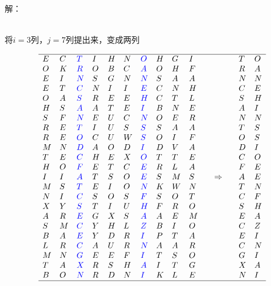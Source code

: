 \documentclass{article}
\begin{document}
解：

~\\

将$i=3$列，$j=7$列提出来，变成两列

$$
\begin{array}{lllllllllllllll}
\hline
E& C& \color{blue}{T}& I& H& N& \color{blue}{O}& H& G& I& &&& T& O\\
O& K& \color{blue}{R}& O& B& C& \color{blue}{A}& O& H& F& &&& R& A\\
E& I& \color{blue}{N}& S& G& N& \color{blue}{N}& S& A& A& &&& N& N\\
E& T& \color{blue}{C}& N& I& I& \color{blue}{E}& C& N& H& &&& C& E\\
O& A& \color{blue}{S}& R& E& E& \color{blue}{H}& C& T& L& &&& S& H\\
H& S& \color{blue}{A}& A& T& E& \color{blue}{I}& B& N& E& &&& A& I\\
S& F& \color{blue}{N}& E& U& C& \color{blue}{N}& O& E& R& &&& N& N\\
R& E& \color{blue}{T}& I& U& S& \color{blue}{S}& S& A& A& &&& T& S\\
R& E& \color{blue}{O}& C& U& W& \color{blue}{S}& O& I& F& &&& O& S\\
M& N& \color{blue}{D}& A& O& D& \color{blue}{I}& D& V& A& &&& D& I\\
T& E& \color{blue}{C}& H& E& X& \color{blue}{O}& T& T& E& &&& C& O\\
H& O& \color{blue}{F}& E& T& C& \color{blue}{E}& R& L& A& &&& F& E\\
I& I& \color{blue}{A}& T& S& O& \color{blue}{E}& S& M& S& &\Rightarrow	&& A& E\\
M& S& \color{blue}{T}& E& I& O& \color{blue}{N}& K& W& N& &&& T& N\\
N& I& \color{blue}{C}& S& O& S& \color{blue}{F}& S& O& T& &&& C& F\\
X& Y& \color{blue}{S}& T& I& U& \color{blue}{H}& F& R& O& &&& S& H\\
A& R& \color{blue}{E}& G& X& S& \color{blue}{A}& A& E& M& &&& E& A\\
S& M& \color{blue}{C}& Y& H& L& \color{blue}{Z}& B& I& O& &&& C& Z\\
B& A& \color{blue}{E}& Y& D& R& \color{blue}{I}& P& T& A& &&& E& I\\
L& R& \color{blue}{C}& A& U& R& \color{blue}{N}& A& A& R& &&& C& N\\
M& N& \color{blue}{G}& E& E& F& \color{blue}{I}& T& S& O& &&& G& I\\
T& A& \color{blue}{X}& R& S& H& \color{blue}{A}& I& T &G& &&& X& A\\
B& O& \color{blue}{N}& R& D& N& \color{blue}{I}& K& L& E& &&& N& I\\
\hline
\end{array}
$$
\end{document}
